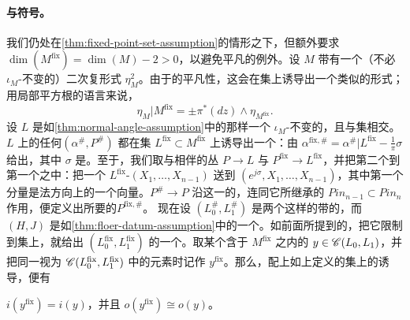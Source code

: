 \paragraph{\trGrading{}与符号。}\label{sub:grading-and-signs}
我们仍处在\cref{thm:fixed-point-set-assumption}的情形之下，但额外要求 $\dim(M^{\mathrm{fix}})=\dim(M)-2>0$，以避免平凡的例外。设 $M$ 带有一个（不必 $\iota_M$-不变的）二次复\trVolume{}形式 $\eta_M^2$。由于\trNormalBundle{}的平凡性，这会在\trFixedPoint{}集上诱导出一个类似的形式；用局部平方根的语言来说，
\begin{equation*}
\eta_M|M^{\mathrm{fix}}=\pm\pi^*(dz)\wedge\eta_{M^{\mathrm{fix}}}.
\end{equation*}
设 $L$ 是如\cref{thm:normal-angle-assumption}中的那样一个 $\iota_M$-不变的\trExact\trLagrange\trSubmanifold，且与\trFixedPoint{}集相交。$L$ 上的任何\trBraneStructure{}$(\alpha^{\#},P^{\#})$ 都在\trFixedPoint{}集 $L^{\mathrm{fix}}\subset M^{\mathrm{fix}}$ 上诱导出一个\trBraneStructure{}：\trGrading{}由 $\alpha^{\mathrm{fix},\#}=\alpha^{\#}|L^{\mathrm{fix}}-\frac{1}{\pi}\sigma$ 给出，其中 $\sigma$ 是\trNormalAngle{}。至于\trPinStructure，我们取与\trTangentBundle{}相伴的\trFrame{}丛 $P\to L$ 与 $P^{\mathrm{fix}}\to L^{\mathrm{fix}}$，并把第二个\trEmbedding{}到第一个之中：把一个 $L^{\mathrm{fix}}$-\trFrame{}$(X_1,\ldots,X_{n-1})$ 送到 $(e^{j\sigma},X_1,\ldots,X_{n-1})$，其中第一个分量是法方向上的一个向量。\trDoubleCover{}$P^{\#}\to P$ 沿这一\trEmbedding{}的\trPullback{}，连同它所继承的 $Pin_{n-1}\subset Pin_n$ 作用，便定义出所要的\trPinStructure{}$P^{\mathrm{fix},\#}$。
现在设 $(L_0^{\#},L_1^{\#})$ 是两个这样的带\trBraneStructure{}的\trLagrange\trSubmanifold，而 $(H,J)$ 是如\cref{thm:floer-datum-assumption}中的一个\trFloerDatum{}。如前面所提到的，把它限制到\trFixedPoint{}集上，就给出 $(L_0^{\mathrm{fix}},L_1^{\mathrm{fix}})$ 的一个\trFloerDatum{}。取某个含于 $M^{\mathrm{fix}}$ 之内的 $y\in\mathscr{C}(L_0,L_1)$，并把同一\trObject{}视为 $\mathscr{C}(L_0^{\mathrm{fix}},L_1^{\mathrm{fix}})$ 中的元素时记作 $y^{\mathrm{fix}}$。那么，配上如上定义的\trFixedPoint{}集上的诱导\trBraneStructure{}，便有
\begin{lemma}\label{thm:equivariant-index-orientation}
$i(y^{\mathrm{fix}})=i(y)$，并且 $o(y^{\mathrm{fix}})\cong o(y)$。
\end{lemma}
